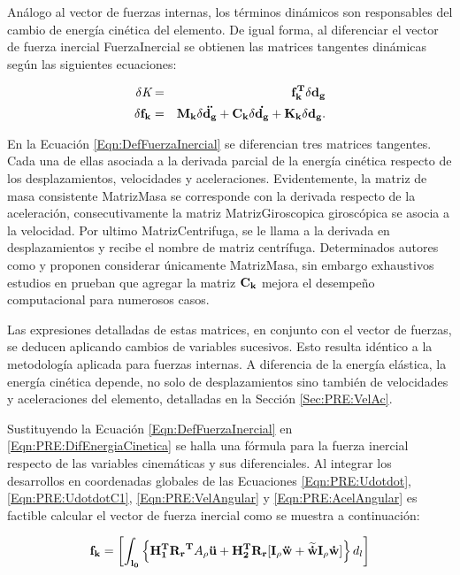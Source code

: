 Análogo al vector de fuerzas internas, los términos dinámicos son responsables del cambio de energía cinética del elemento. De igual forma, al diferenciar el vector de fuerza inercial \gls{FuerzaInercial} se obtienen las matrices tangentes dinámicas según las siguientes ecuaciones:

\begin{eqnarray}
		\label{Eqn:PRE:defFuerzaInercial}
	\delta\textit{K}&=&\bf{f_k^T}\delta\bf{d}_g\\
	\label{Eqn:DefFuerzaInercial}
	\delta\bf{f_k}&=& \bf{M}_k\delta \ddot{\bf{d_g}}+\bf{C}_k\delta
	\dot{\bf{d_g}}+\bf{K}_k\delta{\bf{d_g}}.
\end{eqnarray}


En la Ecuación \eqref{Eqn:DefFuerzaInercial} se diferencian tres matrices tangentes. Cada una de ellas asociada a la derivada parcial de la energía cinética respecto de los desplazamientos, velocidades y aceleraciones. Evidentemente, la matriz de masa consistente \gls{MatrizMasa} se corresponde con la derivada respecto de la aceleración, consecutivamente la matriz \gls{MatrizGiroscopica} giroscópica se asocia a la velocidad. Por ultimo \gls{MatrizCentrifuga}, se le llama a la derivada en desplazamientos y recibe el nombre de matriz centrífuga. Determinados autores como \cite{cardona1988beam} y \cite{hsiao1999consistent} proponen considerar únicamente \gls{MatrizMasa}, sin embargo exhaustivos estudios en \citep{hsiao1999consistent} prueban que agregar la matriz $\bf{C_k}$ mejora el desempeño computacional para numerosos casos.

Las expresiones detalladas de estas matrices, en conjunto con el vector de fuerzas, se deducen aplicando cambios de variables sucesivos. Esto resulta idéntico a la metodología aplicada para fuerzas internas. A diferencia de la energía elástica, la energía cinética depende, no solo de desplazamientos sino también de velocidades y aceleraciones del elemento, detalladas en la Sección \ref{Sec:PRE:VelAc}.

Sustituyendo la Ecuación \eqref{Eqn:DefFuerzaInercial} en \eqref{Eqn:PRE:DifEnergiaCinetica} se halla una fórmula para la fuerza inercial respecto de las variables cinemáticas y sus diferenciales. Al integrar los desarrollos en coordenadas globales de las Ecuaciones \eqref{Eqn:PRE:Udotdot}, \eqref{Eqn:PRE:UdotdotC1}, \eqref{Eqn:PRE:VelAngular} y \eqref{Eqn:PRE:AcelAngular}  es factible calcular el vector de fuerza inercial como se muestra a continuación:

\begin{equation}\label{Eqn:PRE:FuerzaInercial}
\bf{f}_k=\left [ \int _{l_0} \left \{ \bf{H}_1^T\bf{R_r}^T \text{$A_\rho$}\ddot{\bf{u}} +\bf{H}_2^T \bf{R_r} [\bf{I}_\rho\ddot{\bf{w}}+\widetilde{\dot{\bf{w}}}\bf{I}_\rho\dot{w}] \right \} \text{$d_l$} \right  ]
\end{equation}

